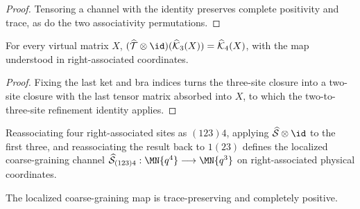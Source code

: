 \begin{proof}\leanok
    Tensoring a channel with the identity preserves complete positivity and
    trace, as do the two associativity permutations.
\end{proof}

\begin{lemma}
    \label{thm:mpdo_localized_physical_t_closure_identity}
    \leanok
    For every virtual matrix $X$,
    $(\widehat{\mathcal T}\otimes\id)
        (\widehat{\mathcal K}_3(X))
        =\widehat{\mathcal K}_4(X)$, with the map understood in
    right-associated coordinates.
\end{lemma}

\begin{proof}\leanok
    Fixing the last ket and bra indices turns the three-site closure into a
    two-site closure with the last tensor matrix absorbed into $X$, to which
    the two-to-three-site refinement identity applies.
\end{proof}

\begin{definition}
    \label{def:mpdo_localized_physical_s_map}
    \leanok
    Reassociating four right-associated sites as $(123)4$, applying
    $\widehat{\mathcal S}\otimes\id$ to the first three, and
    reassociating the result back to $1(23)$ defines the localized
    coarse-graining channel
    $\widehat{\mathcal S}_{(123)4}:\MN{q^4}\longrightarrow\MN{q^3}$
    on right-associated physical coordinates.
\end{definition}

\begin{lemma}
    \label{thm:mpdo_localized_physical_s_map_cptp}
    \leanok
    The localized coarse-graining map is trace-preserving and completely
    positive.
\end{lemma}

